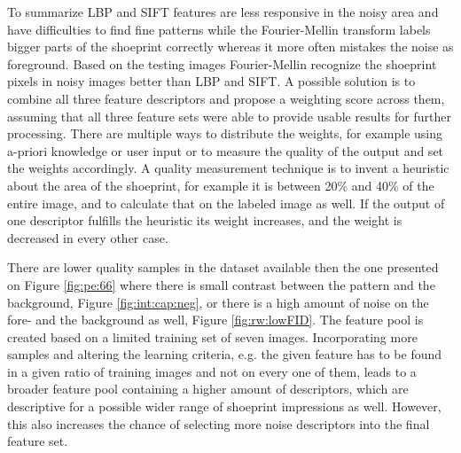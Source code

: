 \documentclass[draft,final]{vutinfth} %
\begin{document}
\par
To summarize LBP and SIFT features are less responsive in the noisy area and have difficulties to find fine patterns while the Fourier-Mellin transform labels bigger parts of the shoeprint correctly whereas it more often mistakes the noise as foreground.
Based on the testing images Fourier-Mellin recognize the shoeprint pixels in noisy images better than LBP and SIFT.
A possible solution is to combine all three feature descriptors and propose a weighting score across them, assuming that all three feature sets were able to provide usable results for further processing.
There are multiple ways to distribute the weights, for example using a-priori knowledge or user input or to measure the quality of the output and set the weights accordingly.
A quality measurement technique is to invent a heuristic about the area of the shoeprint, for example it is between 20\% and 40\% of the entire image, and to calculate that on the labeled image as well.
If the output of one descriptor fulfills the heuristic its weight increases, and the weight is decreased in every other case.
\par
There are lower quality samples in the dataset available then the one presented on Figure  \ref{fig:pe:66} where there is small contrast between the pattern and the background, Figure  \ref{fig:int:cap:neg}, or there is a high amount of noise on the fore- and the background as well, Figure \ref{fig:rw:lowFID}.
The feature pool is created based on a limited training set of seven images.
Incorporating more samples and altering the learning criteria, e.g. the given feature has to be found in a given ratio of training images and not on every one of them, leads to a broader feature pool containing a higher amount of descriptors, which are descriptive for a possible wider range of shoeprint impressions as well.
However, this also increases the chance of selecting more noise descriptors into the final feature set.
\end{document}
